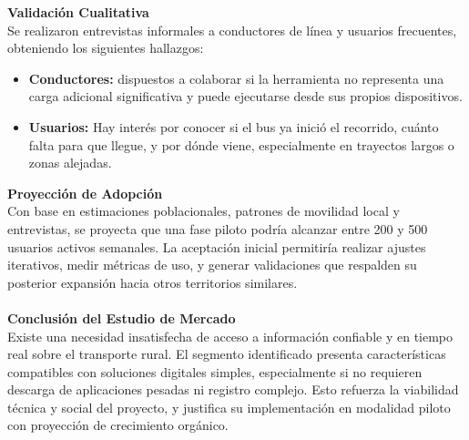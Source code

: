 \documentclass[12pt]{article}
\begin{document}
\newpage
\textbf{Validación Cualitativa}\\
Se realizaron entrevistas informales a conductores de línea y usuarios frecuentes, obteniendo los siguientes hallazgos:
\begin{itemize}
    \item \textbf{Conductores:} dispuestos a colaborar si la herramienta no representa una carga adicional significativa y puede ejecutarse desde sus propios dispositivos.
    \item \textbf{Usuarios:} Hay interés por conocer si el bus ya inició el recorrido, cuánto falta para que llegue, y por dónde viene, especialmente en trayectos largos o zonas alejadas. 
\end{itemize}
\textbf{Proyección de Adopción}\\
Con base en estimaciones poblacionales, patrones de movilidad local y entrevistas, se proyecta que una fase piloto podría alcanzar entre 200 y 500 usuarios activos semanales. La aceptación inicial permitiría realizar ajustes iterativos, medir métricas de uso, y generar validaciones que respalden su posterior expansión hacia otros territorios similares.\\\\
\textbf{Conclusión del Estudio de Mercado}\\
Existe una necesidad insatisfecha de acceso a información confiable y en tiempo real sobre el transporte rural. El segmento identificado presenta características compatibles con soluciones digitales simples, especialmente si no requieren descarga de aplicaciones pesadas ni registro complejo. Esto refuerza la viabilidad técnica y social del proyecto, y justifica su implementación en modalidad piloto con proyección de crecimiento orgánico. 
\newpage
\end{document}
